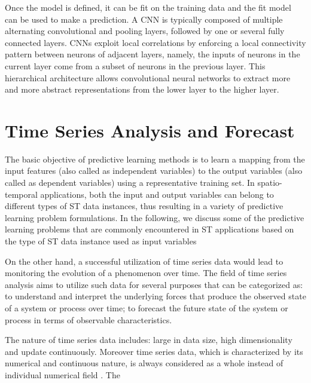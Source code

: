 Once the model is defined, it can be fit on the training data and the fit model can be used to make a prediction. A CNN is typically composed of multiple alternating convolutional and pooling layers, followed by one or several fully connected layers. CNNs exploit local correlations by enforcing a local connectivity pattern between neurons of adjacent layers, namely, the inputs of neurons in the current layer come from a subset of neurons in the previous layer. This hierarchical architecture allows convolutional neural networks to extract more and more abstract representations from the lower layer to the higher layer. 


\section{Time Series Analysis and Forecast}
\label{Sec:TimeSeriesForecast}

The basic objective of predictive learning methods is to learn a mapping from the input features (also called as independent variables) to the output variables (also called as dependent variables) using a representative training set. In spatio-temporal applications, both the input and output variables can belong to different types of ST data instances, thus resulting in a variety of predictive learning problem formulations. In the following, we discuss some of the predictive learning problems that are commonly encountered in ST applications based on the type of ST data instance used as input variables

On the other hand, a successful utilization of time series data would lead to monitoring the evolution of a phenomenon over time. The field of time series analysis aims to utilize such data for several purposes that can be categorized as: to understand and interpret the underlying forces that produce the observed state of a system or process over time; to forecast the future state of the system or process in terms of observable characteristics.

The nature of time series data includes: large in data size, high dimensionality and update continuously. Moreover time series data, which is characterized by its numerical and continuous nature, is always considered as a whole instead of individual numerical field \cite{Pal2017}. The 

